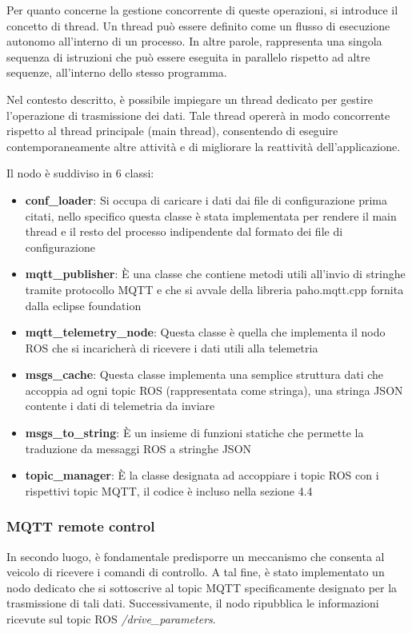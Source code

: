 \noindent Per quanto concerne la gestione concorrente di queste operazioni, si introduce il concetto di thread. Un thread può essere definito come un flusso di esecuzione autonomo all'interno di un processo. In altre parole, rappresenta una singola sequenza di istruzioni che può essere eseguita in parallelo rispetto ad altre sequenze, all'interno dello stesso programma.

\noindent Nel contesto descritto, è possibile impiegare un thread dedicato per gestire l'operazione di trasmissione dei dati. Tale thread opererà in modo concorrente rispetto al thread principale (main thread), consentendo di eseguire contemporaneamente altre attività e di migliorare la reattività dell'applicazione.

\noindent Il nodo è suddiviso in 6 classi:

\begin{itemize}
  \item \textbf{conf\_loader}: Si occupa di caricare i dati dai file di configurazione prima citati, nello specifico questa classe è stata implementata per rendere il main thread e il resto del processo indipendente dal formato dei file di configurazione
  \item \textbf{mqtt\_publisher}: È una classe che contiene metodi utili all'invio di stringhe tramite protocollo MQTT e che si avvale della libreria paho.mqtt.cpp fornita dalla eclipse foundation 
  \item \textbf{mqtt\_telemetry\_node}: Questa classe è quella che implementa il nodo ROS che si incaricherà di ricevere i dati utili alla telemetria
  \item \textbf{msgs\_cache}: Questa classe implementa una semplice struttura dati che accoppia ad ogni topic ROS (rappresentata come stringa), una stringa JSON contente i dati di telemetria da inviare
  \item \textbf{msgs\_to\_string}: È un insieme di funzioni statiche che permette la traduzione da messaggi ROS a stringhe JSON
  \item \textbf{topic\_manager}: È la classe designata ad accoppiare i topic ROS con i rispettivi topic MQTT, il codice è incluso nella sezione 4.4 
\end{itemize}

\subsubsection{MQTT remote control}
In secondo luogo, è fondamentale predisporre un meccanismo che consenta al veicolo di ricevere i comandi di controllo. A tal fine, è stato implementato un nodo dedicato che si sottoscrive al topic MQTT specificamente designato per la trasmissione di tali dati. Successivamente, il nodo ripubblica le informazioni ricevute sul topic ROS \textit{/drive\_parameters}.

